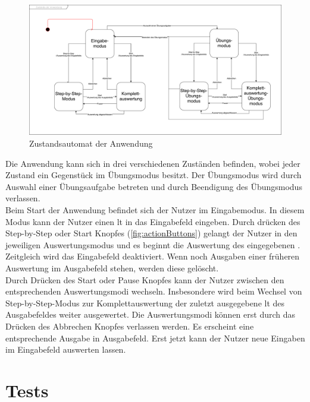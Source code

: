 \documentclass[parskip=full,11pt,twoside]{scrartcl}
\begin{document}
\begin{figure}[H]
	\centering
	\includegraphics[width=\textwidth]{img/Zustandsautomat}
	\caption{\label{fig:state} Zustandsautomat der Anwendung}
\end{figure}

Die Anwendung kann sich in drei verschiedenen Zuständen befinden, wobei jeder Zustand ein Gegenstück im Übungsmodus besitzt. 
Der Übungsmodus wird durch Auswahl einer Übungsaufgabe betreten und durch Beendigung des Übungsmodus verlassen.\\
Beim Start der Anwendung befindet sich der Nutzer im Eingabemodus. In diesem Modus kann der Nutzer einen \gls{lt} in das Eingabefeld eingeben. 
Durch drücken des Step-by-Step oder Start Knopfes (\cref{fig:actionButtons}) gelangt der Nutzer in den jeweiligen Auswertungsmodus und es beginnt die Auswertung des eingegebenen . 
Zeitgleich wird das Eingabefeld deaktiviert. Wenn noch Ausgaben einer früheren Auswertung im Ausgabefeld stehen, werden diese gelöscht.\\ 
Durch Drücken des Start oder Pause Knopfes kann der Nutzer zwischen den entsprechenden Auswertungsmodi wechseln. 
Insbesondere wird beim Wechsel von Step-by-Step-Modus zur Komplettauswertung der zuletzt ausgegebene \gls{lt} des Ausgabefeldes weiter ausgewertet.
Die Auswertungsmodi können erst durch das Drücken des Abbrechen Knopfes verlassen werden. Es erscheint eine entsprechende Ausgabe in Ausgabefeld. Erst jetzt kann der Nutzer neue Eingaben im Eingabefeld auswerten lassen.


\section{Tests}

\end{document}
